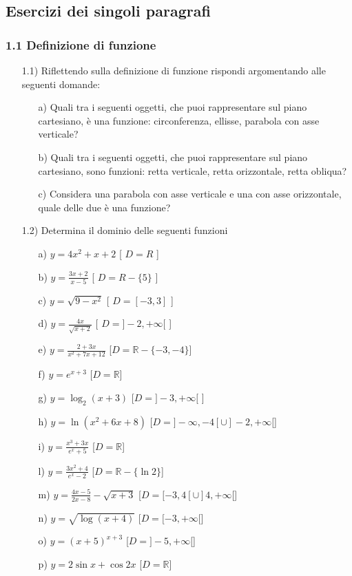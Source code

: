   \subsection{Esercizi dei singoli paragrafi}
  \subsubsection*{1.1 Definizione di funzione}
  \begin{itemize}
  \item[1.1)] Riflettendo sulla definizione di 
funzione rispondi argomentando alle seguenti domande:
  \begin{itemize}
  \item[a)] Quali tra i 
seguenti oggetti, che puoi rappresentare sul piano cartesiano, è una 
funzione: circonferenza, ellisse, parabola con asse verticale?
  \item[b)] Quali tra i 
seguenti oggetti, che puoi rappresentare sul piano cartesiano, sono funzioni: 
retta verticale, retta orizzontale, retta obliqua?
  \item[c)] Considera una 
parabola con asse verticale e una con asse orizzontale, quale delle due è una 
funzione?
  \end{itemize}
  \item[1.2)] Determina il dominio delle 
seguenti funzioni
  \begin{itemize}
  \item[a)] \(y= 4x^2+x+2\)   
   \hfill  [ \(D=R\) ]
  \item[b)] 
\(y=\frac{3x+2}{x-5}\)   \hfill   
   [ \(D=R-\{5\}\) ]
  \item[c)] \(y=\sqrt{9-x^2}   \) 
   \hfill   [ \(D=[-3, 3]\) ]
  \item[d)] 
\(y=\frac{4x}{\sqrt{x+2}}  \)  \hfill   
   [ \(D=]-2,+\infty[\) ]
  \item[e)] 
\(y=\frac{2+3x}{x^2+7x+12}\)   \hfill   
[\(D=\mathbb{R}-\{-3,-4\}\)]
  \item[f)] \(y=e^{x+3}\)\hfill   
   [\(D=\mathbb{R}\)]
  \item[g)] \(y=\log_2(x+3)\)  
\hfill  [\(D=]-3, +\infty[\) ]
  \item [h)] \(y=\ln(x^2+6x+8)\)  
  \hfill   
[\(D=]-\infty,-4[\cup]-2,+\infty[\)]
  
\item[i)]\(y=\frac{x^3+3x}{e^x+5}\)\hfill   
  [\(D=\mathbb{R}\)]
  
\item[l)]\(y=\frac{3x^2+4}{e^x-2}\)   \hfill  
   [\(D=\mathbb{R}-\{\ln2\}\)]
  \item[m)] 
\(y=\frac{4x-5}{2x-8}-\sqrt{x+3}\)  \hfill  
[\(D=[-3,4[\cup]4,+\infty[\)]
  \item[n)]\(y=\sqrt{\log(x+4)}\) 
   \hfill  [\(D=[-3,+\infty[\)]
  \item[o)]\(y=(x+5)^{x+3}\)  
   \hfill  [\(D=]-5,+\infty[\)]
  \item[p)] 
\(y=2\sin{x}+\cos{2x}\)   \hfill   
[\(D=\mathbb{R}\)]
  

\end{itemize}
\end{itemize}
